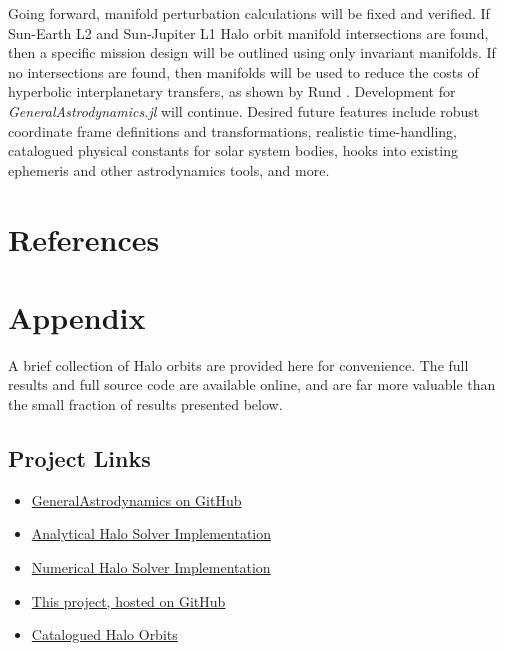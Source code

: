 \documentclass[conf]{new-aiaa}
\renewcommand\refname{}
\begin{document}
\begin{multicols*}{2}
Going forward, manifold perturbation calculations will be fixed and verified.
If Sun-Earth L2 and Sun-Jupiter L1 Halo orbit manifold intersections are 
found, then a specific mission design will be 
outlined using only invariant manifolds. If no intersections are found,
then manifolds will be used to reduce the costs of hyperbolic 
interplanetary transfers, as shown by Rund \cite{rund2018interplanetary}.
Development for \textit{GeneralAstrodynamics.jl} will continue. Desired 
future features include robust coordinate frame definitions and 
transformations, realistic time-handling, catalogued physical constants 
for solar system bodies, hooks into existing ephemeris and other 
astrodynamics tools, and more. 

\section{References}
\nocite{*}
\renewcommand\refname{\vskip -0.9cm}


\end{multicols*}

\section{Appendix}

A brief collection of Halo orbits are provided here for convenience. 
The full results and full source code are available online,
and are far more valuable than the small fraction of results 
presented below.

\subsection*{Project Links}
\begin{itemize}
    \item \href{https://github.com/cadojo/GeneralAstrodynamics.jl}{GeneralAstrodynamics on GitHub}
    \item \href{https://github.com/cadojo/GeneralAstrodynamics.jl/blob/main/src/AstrodynamicsCore/CR3BP/CR3BPCalculations.jl}{Analytical Halo Solver Implementation}
    \item \href{https://github.com/cadojo/GeneralAstrodynamics.jl/blob/main/src/Propagators/CR3BP/Halos.jl}{Numerical Halo Solver Implementation}
    \item \href{https://github.com/cadojo/Halo-Orbit-Explorations}{This project, hosted on GitHub}
    \item \href{https://github.com/cadojo/Halo-Orbit-Explorations/blob/main/data/exp_pro/halos}{Catalogued Halo Orbits}
\end{itemize}
\end{document}
